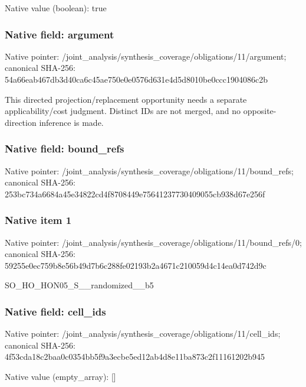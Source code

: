 \documentclass[10pt,a4paper]{article}
\begin{document}
Native value (boolean): true

\subsubsection{Native field: argument}
Native pointer: /joint\_\allowbreak{}analysis/synthesis\_\allowbreak{}coverage/obligations/11/argument; canonical SHA-256: 54a66eab467db3d40ca6c45ae750e0e0576d631e4d5d8010be0ccc1904086c2b

\begingroup\raggedright\sloppy This directed projection/\allowbreak{}replacement opportunity needs a separate applicability/\allowbreak{}cost judgment. Distinct IDs are not merged,\allowbreak{} and no opposite-direction inference is made.\par\endgroup

\subsubsection{Native field: bound\_\allowbreak{}refs}
Native pointer: /joint\_\allowbreak{}analysis/synthesis\_\allowbreak{}coverage/obligations/11/bound\_\allowbreak{}refs; canonical SHA-256: 253bc734a6684a45e34822cd4f8708449e75641237730409055cb938d67e256f

\subsubsection{Native item 1}
Native pointer: /joint\_\allowbreak{}analysis/synthesis\_\allowbreak{}coverage/obligations/11/bound\_\allowbreak{}refs/0; canonical SHA-256: 59255e0ec759b8e56b49d7b6c288fe02193b2a4671c210059d4c14ea0d742d9c

\begingroup\raggedright\sloppy SO\_\allowbreak{}HO\_\allowbreak{}HON05\_\allowbreak{}S\_\allowbreak{}\_\allowbreak{}randomized\_\allowbreak{}\_\allowbreak{}b5\par\endgroup

\subsubsection{Native field: cell\_\allowbreak{}ids}
Native pointer: /joint\_\allowbreak{}analysis/synthesis\_\allowbreak{}coverage/obligations/11/cell\_\allowbreak{}ids; canonical SHA-256: 4f53cda18c2baa0c0354bb5f9a3ecbe5ed12ab4d8e11ba873c2f11161202b945

Native value (empty\_\allowbreak{}array): []
\end{document}

